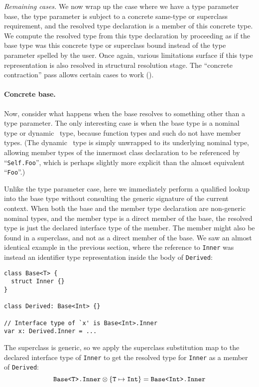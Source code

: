 \documentclass[../generics]{subfiles}
\begin{document}
\smallskip

\emph{Remaining cases.} We now wrap up the case where we have a type parameter base, the type parameter is subject to a concrete same-type or superclass requirement, and the resolved type declaration is a member of this concrete type. We compute the resolved type from this type declaration by proceeding as if the base type was this concrete type or superclass bound instead of the type parameter spelled by the user. Once again, various limitations surface if this type representation is also resolved in structural resolution stage. The ``concrete contraction'' pass allows certain cases to work ().

\paragraph{Concrete base.} Now, consider what happens when the base resolves to something other than a type parameter. The only interesting case is when the base type is a nominal type or dynamic \tSelf\ type, because function types and such do not have member types. (The dynamic \tSelf\ type is simply unwrapped to its underlying nominal type, allowing member types of the innermost class declaration to be referenced by ``\texttt{Self.Foo}'', which is perhaps slightly more explicit than the almost equivalent ``\texttt{Foo}''.)

Unlike the type parameter case, here we immediately perform a qualified lookup into the base type without consulting the generic signature of the current context. When both the base and the member type declaration are non-generic nominal types, and the member type is a direct member of the base, the resolved type is just the declared interface type of the member. The member might also be found in a superclass, and not as a direct member of the base. We saw an almost identical example in the previous section, where the reference to \texttt{Inner} was instead an identifier type representation inside the body of \texttt{Derived}:
\begin{Verbatim}
class Base<T> {
  struct Inner {}
}

class Derived: Base<Int> {}

// Interface type of `x' is Base<Int>.Inner
var x: Derived.Inner = ...
\end{Verbatim}
The superclass is generic, so we apply the superclass substitution map to the declared interface type of \texttt{Inner} to get the resolved type for \texttt{Inner} as a member of \texttt{Derived}:
\[\texttt{Base<T>.Inner}\otimes\{\texttt{T} \mapsto \texttt{Int}\}=\texttt{Base<Int>.Inner}\]
\end{document}

